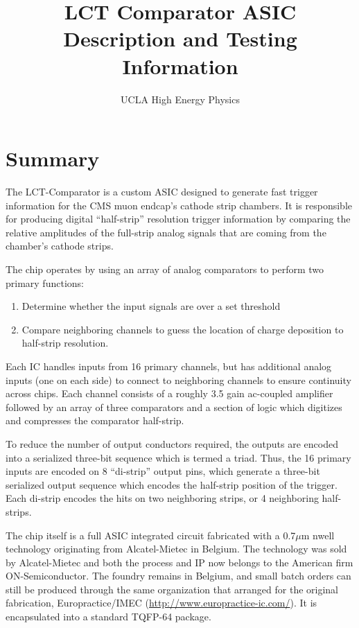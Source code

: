 \documentclass[letterpaper]{article}
\title{LCT Comparator ASIC \\ Description and Testing Information}
\author{UCLA High Energy Physics}
\begin{document}
\maketitle

\tableofcontents

\section{Summary}

The LCT-Comparator is a custom ASIC designed to generate fast trigger information for the CMS muon endcap's cathode strip chambers. It is responsible for producing digital ``half-strip'' resolution trigger information by comparing the relative amplitudes of the full-strip analog signals that are coming from the chamber's cathode strips.

The chip operates by using an array of analog comparators to perform two primary functions:

\begin{enumerate}
    \item Determine whether the input signals are over a set threshold
    \item Compare neighboring channels to guess the location of charge deposition to half-strip resolution.
\end{enumerate}

Each IC handles inputs from 16 primary channels, but has additional analog inputs (one on each side) to connect to neighboring channels to ensure continuity across chips.  Each channel consists of a roughly 3.5 gain ac-coupled amplifier followed by an array of three comparators and a section of logic which digitizes and compresses the comparator half-strip.

To reduce the number of output conductors required, the outputs are encoded into a serialized three-bit sequence which is termed a triad. Thus, the 16 primary inputs are encoded on 8 ``di-strip'' output pins, which generate a three-bit serialized output sequence which encodes the half-strip position of the trigger. Each di-strip encodes the hits on two neighboring strips, or 4 neighboring half-strips.

The chip itself is a full ASIC integrated circuit fabricated with a 0.7$\mu$m nwell technology originating from Alcatel-Mietec in Belgium. The technology was sold by Alcatel-Mietec and both the process and IP now belongs to the American firm ON-Semiconductor. The foundry remains in Belgium, and small batch orders can still be produced through the same organization that arranged for the original fabrication, Europractice/IMEC (\url{http://www.europractice-ic.com/}). It is encapsulated into a standard TQFP-64 package.
\end{document}

